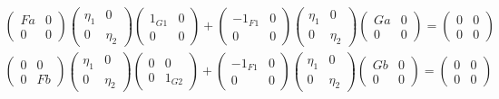 \begin{example}
\begin{subequations}
\begin{align}
\begin{pmatrix} Fa & 0 \\ 0 & 0 \end{pmatrix} \begin{pmatrix} \eta_{1} & 0 \\ 0 & \eta_{2} \end{pmatrix}
\begin{pmatrix} 1_{G1} & 0 \\ 0 & 0 \end{pmatrix}
+ \begin{pmatrix} -1_{F1} & 0 \\ 0 & 0 \end{pmatrix} \begin{pmatrix} \eta_{1} & 0 \\ 0 & \eta_{2} \end{pmatrix}
\begin{pmatrix} Ga & 0 \\ 0 & 0 \end{pmatrix} = \begin{pmatrix} 0 & 0 \\ 0 & 0 \end{pmatrix} \\
\begin{pmatrix} 0 & 0 \\ 0 & Fb \end{pmatrix} \begin{pmatrix} \eta_{1} & 0 \\ 0 & \eta_{2} \end{pmatrix}
\begin{pmatrix} 0 & 0 \\ 0 & 1_{G2} \end{pmatrix}
+ \begin{pmatrix} -1_{F1} & 0 \\ 0 & 0 \end{pmatrix} \begin{pmatrix} \eta_{1} & 0 \\ 0 & \eta_{2} \end{pmatrix}
\begin{pmatrix} Gb & 0 \\ 0 & 0 \end{pmatrix} = \begin{pmatrix} 0 & 0 \\ 0 & 0 \end{pmatrix} \\

\end{align}
\end{subequations}
\end{example}
